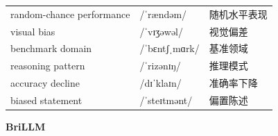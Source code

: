 \documentclass[UTF8,12pt,a4paper]{ctexart}
\providecommand{\zh}[1]{#1}
\begin{document}
\begin{tabular*}{\textwidth}{@{\extracolsep{\fill}}lll@{}}
random-chance performance & {\ipafont /ˈrændəm/} & \zh{随机水平表现} \\
visual bias & {\ipafont /ˈvɪʒəwəl/} & \zh{视觉偏差} \\
benchmark domain & {\ipafont /ˈbɛntʃˌmɑrk/} & \zh{基准领域} \\
reasoning pattern & {\ipafont /ˈrizənɪŋ/} & \zh{推理模式} \\
accuracy decline & {\ipafont /dɪˈklaɪn/} & \zh{准确率下降} \\
biased statement & {\ipafont /ˈsteɪtmənt/} & \zh{偏置陈述} \\
\bottomrule
\end{tabular*}

\newpage

\begin{center}
    {\Large\bfseries BriLLM}
\end{center}
\end{document}
